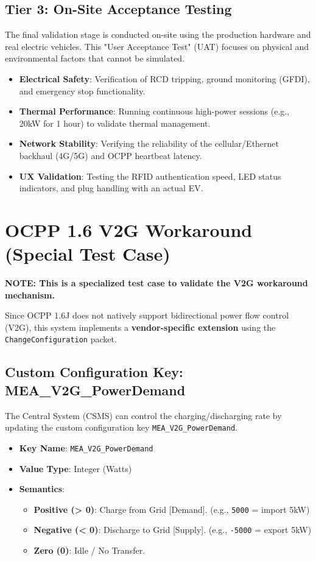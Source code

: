 \documentclass[a4paper,11pt]{report}
\begin{document}
\subsection{Tier 3: On-Site Acceptance Testing}
The final validation stage is conducted on-site using the production hardware and real electric vehicles. This "User Acceptance Test" (UAT) focuses on physical and environmental factors that cannot be simulated.
\begin{itemize}
    \item \textbf{Electrical Safety}: Verification of RCD tripping, ground monitoring (GFDI), and emergency stop functionality.
    \item \textbf{Thermal Performance}: Running continuous high-power sessions (e.g., 20kW for 1 hour) to validate thermal management.
    \item \textbf{Network Stability}: Verifying the reliability of the cellular/Ethernet backhaul (4G/5G) and OCPP heartbeat latency.
    \item \textbf{UX Validation}: Testing the RFID authentication speed, LED status indicators, and plug handling with an actual EV.
\end{itemize}

\section{OCPP 1.6 V2G Workaround (Special Test Case)}
\textbf{NOTE: This is a specialized test case to validate the V2G workaround mechanism.}

Since OCPP 1.6J does not natively support bidirectional power flow control (V2G), this system implements a \textbf{vendor-specific extension} using the \texttt{ChangeConfiguration} packet.

\subsection{Custom Configuration Key: MEA\_V2G\_PowerDemand}
The Central System (CSMS) can control the charging/discharging rate by updating the custom configuration key \texttt{MEA\_V2G\_PowerDemand}.

\begin{itemize}
    \item \textbf{Key Name}: \texttt{MEA\_V2G\_PowerDemand}
    \item \textbf{Value Type}: Integer (Watts)
    \item \textbf{Semantics}:
    \begin{itemize}
        \item \textbf{Positive (> 0)}: Charge from Grid [Demand]. (e.g., \texttt{5000} = import 5kW)
        \item \textbf{Negative (< 0)}: Discharge to Grid [Supply]. (e.g., \texttt{-5000} = export 5kW)
        \item \textbf{Zero (0)}: Idle / No Transfer.
    \end{itemize}
\end{itemize}
\end{document}
